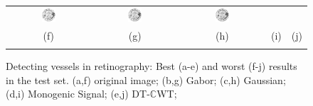\documentclass{IEEEtran}
\def\dtcwt{DT-$\mathbb{C}$WT}
\begin{document}
\begin{figure}[t]
\begin{tabular}{@{}c c c c c@{}}
\includegraphics[width=0.18\textwidth]{figs/retina/08_DRIVE_segmentation_gh2da_inv} &
\includegraphics[width=0.18\textwidth]{figs/retina/08_DRIVE_segmentation_mono_inv} &
\includegraphics[width=0.18\textwidth]{figs/retina/08_DRIVE_segmentation_dt_inv} \\
(f) & (g) & (h) & (i)  & (j) \\
\noalign{\smallskip}
\end{tabular}
%
\caption{Detecting vessels in retinography: Best (a-e) and worst (f-j) results in the test set. %
(a,f) original image; %
(b,g) Gabor; %
(c,h) Gaussian; %
(d,i) Monogenic Signal; %
(e,j) \dtcwt; %
}
\label{f:drive_segmentations}
\end{figure}
%
\end{document}
